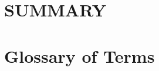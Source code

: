 \documentclass[a4paper,12pt,oneside]{ThesisStyle}
\begin{document}
\cleardoublepage

\chapter*{SUMMARY}


\cleardoublepage


\newcommand{\footcaption}[1]{\caption[#1]{#1\footnotemark.}}

\tableofcontents
\listoffigures 
\listoftables

\cleardoublepage

\chapter*{Glossary of Terms }
\end{document}

